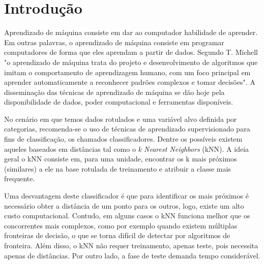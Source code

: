 \documentclass[
	12pt,				%
	openright,			%
	twoside,			%
	a4paper,			%
	english,			%
	brazil,				%
	svgnames
	]{abntex2}\usepackage[]{graphicx}\usepackage[]{color}
\begin{document}

\tableofcontents*
\cleardoublepage

\textual

\chapter{Introdução}
\label{cap:introducao}


Aprendizado de máquina consiste em dar ao computador habilidade de aprender. Em outras palavras, o aprendizado de máquina consiste em programar computadores de forma que eles aprendam a partir de dados. Segundo T. Michell "o aprendizado de máquina trata do projeto e desenvolvimento de algoritmos que imitam o comportamento de aprendizagem humano, com um foco principal em aprender automaticamente a reconhecer padrões complexos e tomar decisões". A disseminação das técnicas de aprendizado de máquina se dão hoje pela disponibilidade de dados, poder computacional e ferramentas disponíveis.

No cenário em que temos dados rotulados e uma variável alvo definida por categorias, recomenda-se o uso de técnicas de aprendizado supervisionado para fins de classificação, os chamados classificadores. Dentre os possíveis existem aqueles baseados em distâncias tal como o \emph{k Nearest Neighbors} (kNN). A ideia geral o kNN consiste em, para uma unidade, encontrar os k mais próximos (similares) a ele na base rotulada de treinamento e atribuir a classe mais frequente.

Uma desvantagem deste classificador é que para identificar os mais próximos é necessário obter a distância de um ponto para os outros, logo, existe um alto custo computacional. Contudo, em alguns casos o kNN funciona melhor que os concorrentes mais complexos, como por exemplo quando existem múltiplas fronteiras de decisão, o que se torna difícil de detectar por algoritmos de fronteira. Além disso, o kNN não requer treinamento, apenas teste, pois necessita apenas de distâncias. Por outro lado, a fase de teste demanda tempo considerável.
\end{document}
